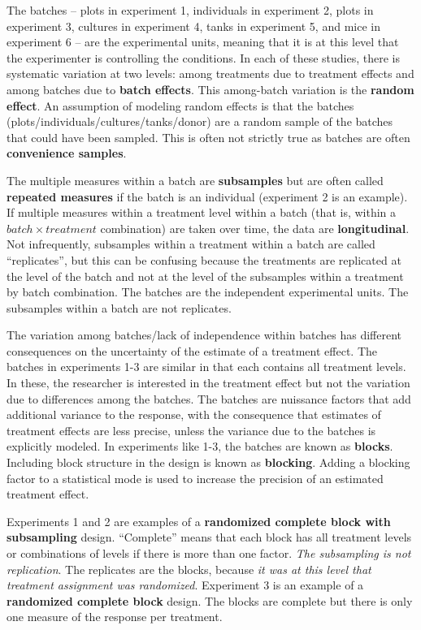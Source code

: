 \documentclass[]{book}
\begin{document}
The batches -- plots in experiment 1, individuals in experiment 2, plots in experiment 3, cultures in experiment 4, tanks in experiment 5, and mice in experiment 6 -- are the experimental units, meaning that it is at this level that the experimenter is controlling the conditions. In each of these studies, there is systematic variation at two levels: among treatments due to treatment effects and among batches due to \textbf{batch effects}. This among-batch variation is the \textbf{random effect}. An assumption of modeling random effects is that the batches (plots/individuals/cultures/tanks/donor) are a random sample of the batches that could have been sampled. This is often not strictly true as batches are often \textbf{convenience samples}.

The multiple measures within a batch are \textbf{subsamples} but are often called \textbf{repeated measures} if the batch is an individual (experiment 2 is an example). If multiple measures within a treatment level within a batch (that is, within a \(batch \times treatment\) combination) are taken over time, the data are \textbf{longitudinal}. Not infrequently, subsamples within a treatment within a batch are called ``replicates'', but this can be confusing because the treatments are replicated at the level of the batch and not at the level of the subsamples within a treatment by batch combination. The batches are the independent experimental units. The subsamples within a batch are not replicates.

The variation among batches/lack of independence within batches has different consequences on the uncertainty of the estimate of a treatment effect. The batches in experiments 1-3 are similar in that each contains all treatment levels. In these, the researcher is interested in the treatment effect but not the variation due to differences among the batches. The batches are nuissance factors that add additional variance to the response, with the consequence that estimates of treatment effects are less precise, unless the variance due to the batches is explicitly modeled. In experiments like 1-3, the batches are known as \textbf{blocks}. Including block structure in the design is known as \textbf{blocking}. Adding a blocking factor to a statistical mode is used to increase the precision of an estimated treatment effect.

Experiments 1 and 2 are examples of a \textbf{randomized complete block with subsampling} design. ``Complete'' means that each block has all treatment levels or combinations of levels if there is more than one factor. \emph{The subsampling is not replication}. The replicates are the blocks, because \emph{it was at this level that treatment assignment was randomized}. Experiment 3 is an example of a \textbf{randomized complete block} design. The blocks are complete but there is only one measure of the response per treatment.
\end{document}
